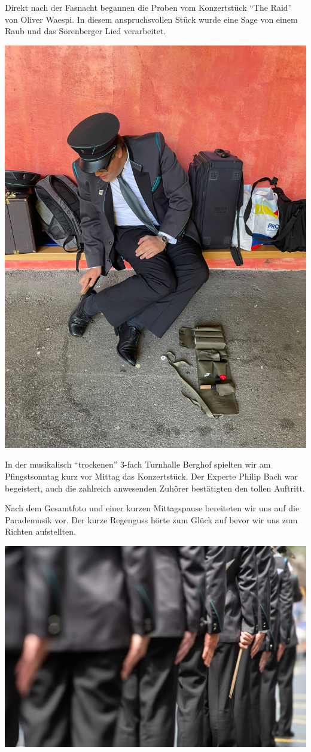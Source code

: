 \begin{history}

    Direkt nach der Fasnacht begannen die Proben vom Konzertstück \enquote{The
        Raid} von Oliver Waespi. In diesem anspruchsvollen Stück wurde eine Sage
    von einem Raub und das Sörenberger Lied verarbeitet.

    \begin{MulticolFigure}
        \centering
        \includegraphics[width=0.5\linewidth]{./chap/2001-2024/2024/MT-Wolhusen-saubere-Schuhe.jpeg}
    \end{MulticolFigure}

    In der musikalisch \enquote{trockenen} 3-fach Turnhalle Berghof spielten wir
    am Pfingstsonntag kurz vor Mittag das Konzertstück. Der Experte Philip Bach
    war begeistert, auch die zahlreich anwesenden Zuhörer bestätigten den tollen
    Auftritt.


    Nach dem Gesamtfoto und einer kurzen Mittagspause bereiteten wir uns auf die
    Parademusik vor. Der kurze Regenguss hörte zum Glück auf bevor wir uns zum
    Richten aufstellten.

    \begin{MulticolFigure}
        \centering
        \includegraphics[width=0.93\linewidth]{./chap/2001-2024/2024/Wolhusen-2.jpg}
    \end{MulticolFigure}


\end{history}
